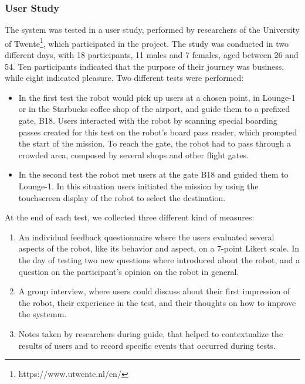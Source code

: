 \subsubsection{User Study}

The system was tested in a user study, performed by researchers of the University of Twente\footnote{https://www.utwente.nl/en/}, which participated in the project. The study was conducted in two different days, with 18 participants, 11 males and 7 females, aged between 26 and 54. Ten participants indicated that the purpose of their journey was business, while eight indicated pleasure. Two different tests were performed:

\begin{itemize} 
\item In the first test the robot would pick up users at a chosen point, in Lounge-1 or in the Starbucks coffee shop of the airport, and guide them to a prefixed gate, B18. Users interacted with the robot by scanning special boarding passes created for this test on the robot's board pass reader, which prompted the start of the mission. To reach the gate, the robot had to pass through a crowded area, composed by several shops and other flight gates.
\item In the second test the robot met users at the gate B18 and guided them to Lounge-1. In this situation users initiated the mission by using the touchscreen display of the robot to select the destination.
\end{itemize}

At the end of each test, we collected three different kind of measures:
\begin{enumerate}
\item An individual feedback questionnaire where the users evaluated several aspects of the robot, like its behavior and aspect, on a 7-point Likert scale. In the day of testing two new questions where introduced about the robot, and a question on the participant's opinion on the robot in general.
\item A group interview, where users could discuss about their first impression of the robot, their experience in the test, and their thoughts on how to improve the systemm.
\item  Notes taken by researchers during guide, that helped to contextualize the results of users and to record specific events that occurred during tests.
\end{enumerate}


